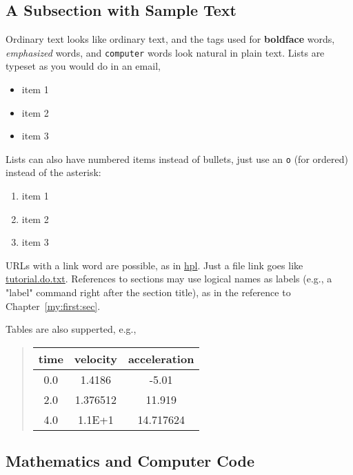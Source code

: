 \documentclass{article}
\begin{document}
\subsection{A Subsection with Sample Text}

Ordinary text looks like ordinary text, and the tags used for
\textbf{boldface} words, \emph{emphasized} words, and {\fontsize{10pt}{10pt}\verb!computer!} words look
natural in plain text.  Lists are typeset as you would do in an email,

\begin{itemize}
  \item item 1
  \item item 2
  \item item 3
\end{itemize}
Lists can also have numbered items instead of bullets, just use an {\fontsize{10pt}{10pt}\verb!o!}
(for ordered) instead of the asterisk:

\begin{enumerate}
 \item item 1
 \item item 2
 \item item 3
\end{enumerate}
URLs with a link word are possible, as in \href{http://folk.uio.no/hpl}{hpl}.
Just a file link goes like \href{tutorial.do.txt}{tutorial.do.txt}. References
to sections may use logical names as labels (e.g., a "label" command right
after the section title), as in the reference to 
Chapter~\ref{my:first:sec}.

Tables are also supperted, e.g.,


\begin{quote}\begin{tabular}{ccc}
\hline
\multicolumn{1}{c}{time} & \multicolumn{1}{c}{velocity} & \multicolumn{1}{c}{acceleration} \\
\hline
0.0          & 1.4186       & -5.01        \\
2.0          & 1.376512     & 11.919       \\
4.0          & 1.1E+1       & 14.717624    \\
\hline
\end{tabular}\end{quote}

\noindent

\subsection{Mathematics and Computer Code}
\end{document}
